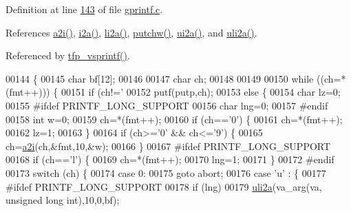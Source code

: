 Definition at line \hyperlink{a00043_source_l00143}{143} of file \hyperlink{a00043_source}{gprintf.\+c}.



References \hyperlink{a00043_source_l00115}{a2i()}, \hyperlink{a00043_source_l00095}{i2a()}, \hyperlink{a00043_source_l00066}{li2a()}, \hyperlink{a00043_source_l00130}{putchw()}, \hyperlink{a00043_source_l00077}{ui2a()}, and \hyperlink{a00043_source_l00048}{uli2a()}.



Referenced by \hyperlink{a00043_source_l00230}{tfp\+\_\+vsprintf()}.


\begin{DoxyCode}
00144     \{
00145     \textcolor{keywordtype}{char} bf[12];
00146     
00147     \textcolor{keywordtype}{char} ch;
00148 
00149 
00150     \textcolor{keywordflow}{while} ((ch=*(fmt++))) \{
00151         \textcolor{keywordflow}{if} (ch!=\textcolor{charliteral}{'%
00152             putf(putp,ch);
00153         \textcolor{keywordflow}{else} \{
00154             \textcolor{keywordtype}{char} lz=0;
00155 \textcolor{preprocessor}{#ifdef  PRINTF\_LONG\_SUPPORT}
00156             \textcolor{keywordtype}{char} lng=0;
00157 \textcolor{preprocessor}{#endif}
00158             \textcolor{keywordtype}{int} w=0;
00159             ch=*(fmt++);
00160             \textcolor{keywordflow}{if} (ch==\textcolor{charliteral}{'0'}) \{
00161                 ch=*(fmt++);
00162                 lz=1;
00163                 \}
00164             \textcolor{keywordflow}{if} (ch>=\textcolor{charliteral}{'0'} && ch<=\textcolor{charliteral}{'9'}) \{
00165                 ch=\hyperlink{a00043_aeadd3398ed3a27d05fd6638133feb559}{a2i}(ch,&fmt,10,&w);
00166                 \}
00167 \textcolor{preprocessor}{#ifdef  PRINTF\_LONG\_SUPPORT}
00168             \textcolor{keywordflow}{if} (ch==\textcolor{charliteral}{'l'}) \{
00169                 ch=*(fmt++);
00170                 lng=1;
00171             \}
00172 \textcolor{preprocessor}{#endif}
00173             \textcolor{keywordflow}{switch} (ch) \{
00174                 \textcolor{keywordflow}{case} 0: 
00175                     \textcolor{keywordflow}{goto} abort;
00176                 \textcolor{keywordflow}{case} \textcolor{charliteral}{'u'} : \{
00177 \textcolor{preprocessor}{#ifdef  PRINTF\_LONG\_SUPPORT}
00178                     \textcolor{keywordflow}{if} (lng)
00179                         \hyperlink{a00043_ac8448f6a2ace7b25fc6fbd5561fe5e75}{uli2a}(va\_arg(va, \textcolor{keywordtype}{unsigned} \textcolor{keywordtype}{long} \textcolor{keywordtype}{int}),10,0,bf);
}
\end{DoxyCode}
